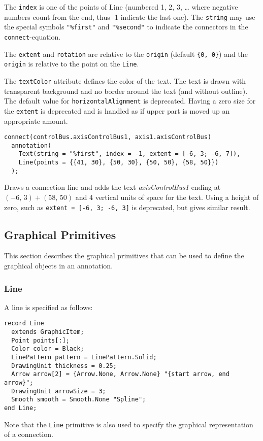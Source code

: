 The \lstinline!index! is one of the points of Line (numbered 1, 2, 3, \ldots{} where negative numbers count from the end, thus -1 indicate the last one).
The \lstinline!string! may use the special symbols \lstinline!"%first"! and \lstinline!"%second"! to indicate the connectors in the \lstinline!connect!-equation.

The \lstinline!extent! and \lstinline!rotation! are relative to the \lstinline!origin! (default \lstinline!{0, 0}!) and the \lstinline!origin! is relative to the point on the \lstinline!Line!.

The \lstinline!textColor! attribute defines the color of the text.
The text is drawn with transparent background and no border around the text (and without outline).
The default value for \lstinline!horizontalAlignment! is deprecated.
Having a zero size for the \lstinline!extent! is deprecated and is handled as if upper part is moved up an appropriate amount.

\begin{example}
\begin{lstlisting}[language=modelica]
connect(controlBus.axisControlBus1, axis1.axisControlBus)
  annotation(
    Text(string = "%first", index = -1, extent = [-6, 3; -6, 7]),
    Line(points = {{41, 30}, {50, 30}, {50, 50}, {58, 50}})
  );
\end{lstlisting}
Draws a connection line and adds the text \emph{axisControlBus1} ending at $(-6,\, 3) + (58,\, 50)$ and 4 vertical units of space for the text.
Using a height of zero, such as \lstinline!extent = [-6, 3; -6, 3]! is deprecated, but gives similar result.
\end{example}

\subsection{Graphical Primitives}\label{graphical-primitives}

This section describes the graphical primitives that can be used to define the graphical objects in an annotation.

\subsubsection{Line}\label{line}

A line is specified as follows:
\begin{lstlisting}[language=modelica]
record Line
  extends GraphicItem;
  Point points[:];
  Color color = Black;
  LinePattern pattern = LinePattern.Solid;
  DrawingUnit thickness = 0.25;
  Arrow arrow[2] = {Arrow.None, Arrow.None} "{start arrow, end arrow}";
  DrawingUnit arrowSize = 3;
  Smooth smooth = Smooth.None "Spline";
end Line;
\end{lstlisting}%
Note that the \lstinline!Line! primitive is also used to specify the graphical representation of a connection.

